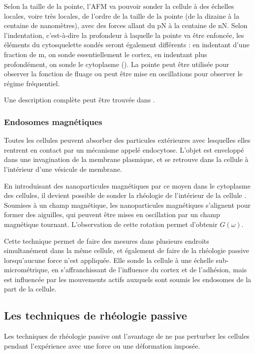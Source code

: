 Selon la taille de la pointe, l'AFM va pouvoir sonder la cellule à des échelles locales, voire très locales, de l'ordre de la taille de la pointe (de la dizaine à la centaine de nanomètres), avec des forces allant du pN à la centaine de nN. Selon l'indentation, c'est-à-dire la profondeur à laquelle la pointe va être enfoncée, les éléments du cytosquelette sondés seront également différents : en indentant d’une fraction de \micro m, on sonde essentiellement le cortex, en indentant plus profondément, on sonde le cytoplasme (\cite{kasas_superficial_2005}). 
La pointe peut être utilisée pour observer la fonction de fluage ou peut être mise en oscillations pour observer le régime fréquentiel. 

Une description complète peut être trouvée dans \cite{gautier_atomic_2015}. 

\subsubsection{Endosomes magnétiques}

Toutes les cellules peuvent absorber des particules extérieures avec lesquelles elles rentrent en contact par un mécanisme appelé endocytose. L'objet est enveloppé dans une invagination de la membrane plasmique, et se retrouve dans la cellule à l'intérieur d'une vésicule de membrane. 

En introduisant des nanoparticules magnétiques par ce moyen dans le cytoplasme des cellules, il devient possible de sonder la rhéologie de l'intérieur de la cellule \parencite{robert_magnetic_2012}. 
Soumises à un champ magnétique, les nanoparticules magnétiques s'alignent pour former des aiguilles, qui peuvent être mises en oscillation par un champ magnétique tournant. 
L'observation de cette rotation permet d'obtenir $G(\omega)$. 

Cette technique permet de faire des mesures dans plusieurs endroits  simultanément dans la même cellule, et également de faire de la rhéologie passive lorsqu'aucune force n'est appliquée. Elle sonde la cellule à une échelle sub-micrométrique, en s'affranchissant de l'influence du cortex et de l'adhésion, mais est influencée par les mouvements actifs auxquels sont soumis les endosomes de la part de la cellule. 

\subsection{Les techniques de rhéologie passive}
Les techniques de rhéologie passive ont l'avantage de ne pas perturber les cellules pendant l'expérience avec une force ou une déformation imposée. 

